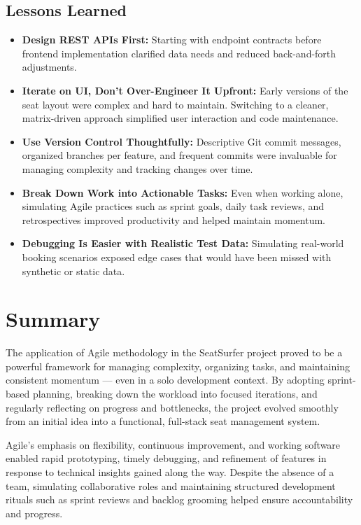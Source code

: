 \documentclass[12pt,a4paper]{report}
\begin{document}
\subsection*{Lessons Learned}

\begin{itemize}
\item \textbf{Design REST APIs First:}
Starting with endpoint contracts before frontend implementation clarified data needs and reduced back-and-forth adjustments.
\item \textbf{Iterate on UI, Don’t Over-Engineer It Upfront:}  
Early versions of the seat layout were complex and hard to maintain. Switching to a cleaner, matrix-driven approach simplified user interaction and code maintenance.
\item \textbf{Use Version Control Thoughtfully:}  
Descriptive Git commit messages, organized branches per feature, and frequent commits were invaluable for managing complexity and tracking changes over time.
\item \textbf{Break Down Work into Actionable Tasks:}  
Even when working alone, simulating Agile practices such as sprint goals, daily task reviews, and retrospectives improved productivity and helped maintain momentum.
\item \textbf{Debugging Is Easier with Realistic Test Data:}  
Simulating real-world booking scenarios exposed edge cases that would have been missed with synthetic or static data.
\end{itemize}

\section{Summary}

The application of Agile methodology in the SeatSurfer project proved to be a powerful framework for managing complexity, organizing tasks, and maintaining consistent momentum — even in a solo development context. By adopting sprint-based planning, breaking down the workload into focused iterations, and regularly reflecting on progress and bottlenecks, the project evolved smoothly from an initial idea into a functional, full-stack seat management system.

Agile's emphasis on flexibility, continuous improvement, and working software enabled rapid prototyping, timely debugging, and refinement of features in response to technical insights gained along the way. Despite the absence of a team, simulating collaborative roles and maintaining structured development rituals such as sprint reviews and backlog grooming helped ensure accountability and progress.
\end{document}
